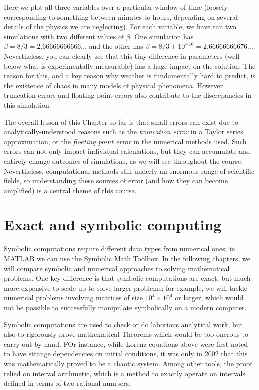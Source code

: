 \documentclass[
  letterpaper,
  DIV=11,
  numbers=noendperiod]{scrreprt}
\begin{document}
Here we plot all three variables over a particular window of time
(loosely corresponding to something between minutes to hours, depending
on several details of the physics we are neglecting). For each variable,
we have ran two simulations with two different values of \(\beta\). One
simulation has \(\beta = 8/3 = 2.66666666666\dots\) and the other has
\(\beta = 8/3 + 10^{-10} = 2.66666666676\dots\). Nevertheless, you can
clearly see that this tiny difference in parameters (well below what is
experimentally measurable) has a huge impact on the solution. The reason
for this, and a key reason why weather is fundamentally hard to predict,
is the existence of
\href{https://en.wikipedia.org/wiki/Chaos_theory}{chaos} in many models
of physical phenomena. However truncation errors and floating point
errors also contribute to the discrepancies in this simulation.

The overall lesson of this Chapter so far is that small errors can exist
due to analytically-understood reasons such as the \emph{truncation
error} in a Taylor series approximation, or the \emph{floating point
error} in the numerical methods used. Such errors can not only impact
individual calculations, but they can accumulate and entirely change
outcomes of simulations, as we will see throughout the course.
Nevertheless, computational methods still underly an enormous range of
scientific fields, so understanding these sources of error (and how they
can become amplified) is a central theme of this course.

\section{Exact and symbolic
computing}\label{exact-and-symbolic-computing}

Symbolic computations require different data types from numerical ones;
in MATLAB we can use the
\href{https://uk.mathworks.com/help/symbolic/symbolic-computations-in-matlab.html}{Symbolic
Math Toolbox}. In the following chapters, we will compare symbolic and
numerical approaches to solving mathematical problems. One key
difference is that symbolic computations are exact, but much more
expensive to scale up to solve larger problems; for example, we will
tackle numerical problems involving matrices of size
\(10^4 \times 10^4\) or larger, which would not be possible to
successfully manipulate symbolically on a modern computer.

Symbolic computations are used to check or do laborious analytical work,
but also to rigorously prove mathematical Theorems which would be too
onerous to carry out by hand. FOr instance, while Lorenz equations above
were first noted to have strange dependencies on initial conditions, it
was only in 2002 that this was mathematically proved to be a chaotic
system. Among other tools, the proof relied on
\href{https://en.wikipedia.org/wiki/Interval_arithmetic}{interval
arithmetic}, which is a method to exactly operate on intervals defined
in terms of two rational numbers.
\end{document}

